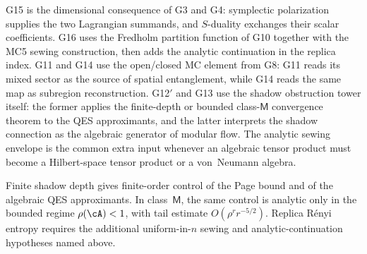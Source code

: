 \begin{remark}
\label{rem:thqg-g11-g16-dependencies}
G15 is the dimensional consequence of G3 and G4: symplectic
polarization supplies the two Lagrangian summands, and $S$-duality
exchanges their scalar coefficients.  G16 uses the Fredholm partition
function of G10 together with the MC5 sewing construction, then adds
the analytic continuation in the replica index.  G11 and G14 use the
open/closed MC element from G8: G11 reads its mixed sector as the
source of spatial entanglement, while G14 reads the same map as
subregion reconstruction.  G12$'$ and G13 use the shadow obstruction
tower itself: the former applies the finite-depth or bounded
class-$\mathsf M$ convergence theorem to the QES approximants, and the
latter interprets the shadow connection as the algebraic generator of
modular flow.  The analytic sewing envelope is the common extra input
whenever an algebraic tensor product must become a Hilbert-space tensor
product or a von~Neumann algebra.
\end{remark}

\begin{remark}
\label{rem:thqg-convergent-advantage}
Finite shadow depth gives finite-order control of the Page
bound and of the algebraic QES approximants.  In class~$\mathsf M$,
the same control is analytic only in the bounded regime
$\rho(\cA)<1$, with tail estimate $O(\rho^r r^{-5/2})$.  Replica
R\'enyi entropy requires the additional uniform-in-$n$ sewing and
analytic-continuation hypotheses named above.
\end{remark}
